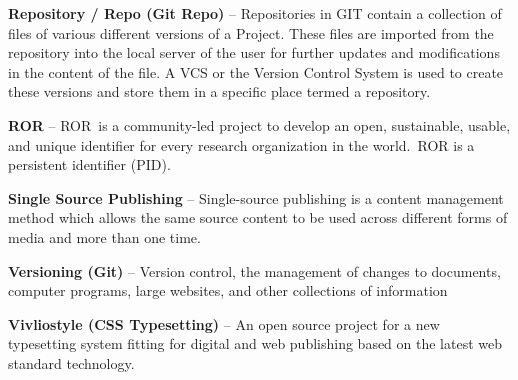 \documentclass{article}
\begin{document}
\textbf{Repository / Repo (Git Repo)} – Repositories in GIT contain a collection of files of various different versions of a Project. These files are imported from the repository into the local server of the user for further updates and modifications in the content of the file. A VCS or the Version Control System is used to create these versions and store them in a specific place termed a repository.


\textbf{ROR} – ROR is a community-led project to develop an open, sustainable, usable, and unique identifier for every research organization in the world. ROR is a persistent identifier (PID). 


\textbf{Single Source Publishing} – Single-source publishing is a content management method which allows the same source content to be used across different forms of media and more than one time.


\textbf{Versioning (Git)} – Version control, the management of changes to documents, computer programs, large websites, and other collections of information


\textbf{Vivliostyle (CSS Typesetting)} – An open source project for a new typesetting system fitting for digital and web publishing based on the latest web standard technology.
\end{document}
